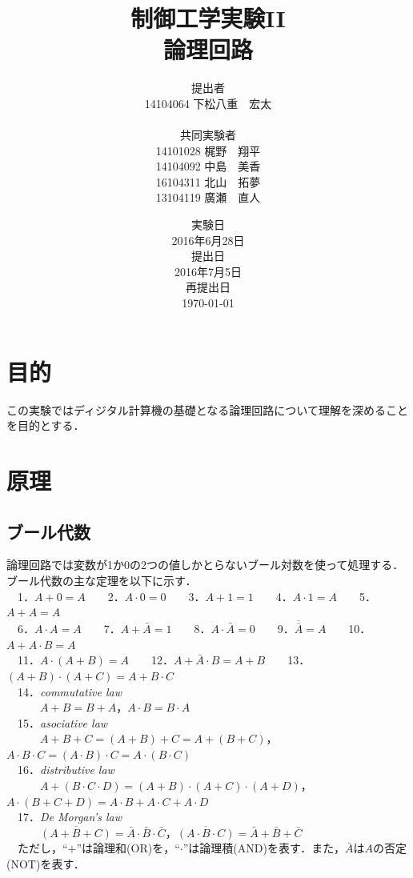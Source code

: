 \documentclass[11pt,a4paper]{jsarticle}
\begin{document}
\title{制御工学実験II \\ 論理回路}
\author{提出者 \\ 14104064 下松八重　宏太 \\ \\ 共同実験者 \\ 14101028 梶野　翔平 \\ 14104092 中島　美香 \\ 16104311 北山　拓夢 \\ 13104119 廣瀬　直人}
\date{実験日 \\ 2016年6月28日 \\ 提出日 \\ 2016年7月5日 \\ 再提出日 \\ \today}



\maketitle
\thispagestyle{empty}
\newpage


 \section{目的}
この実験ではディジタル計算機の基礎となる論理回路について理解を深めることを目的とする．
 \section{原理}
  \subsection{ブール代数}
  論理回路では変数が1か0の2つの値しかとらないブール対数を使って処理する．ブール代数の主な定理を以下に示す．\\
　1．$A+0 = A$\ \ \ \ 2．$A \cdot 0 = 0$\ \ \ \ 3．$A+1 = 1$\ \ \ \ 4．$A \cdot 1 = A$\ \ \ \ 5．$A+A = A$ \\
　6．$A \cdot A = A$\ \ \ \ 7．$A+ \bar A = 1$\ \ \ \ 8．$A \cdot \bar A = 0$\ \ \ \ 9．$\overline{\overline{A}} = A$\ \ \ \ 10．$A + A \cdot B = A$ \\
　11．$A \cdot (A + B) = A$\ \ \ \ 12．$A + \bar A \cdot B = A + B$\ \ \ \ 13．$(A+B)\cdot(A+C) = A+B\cdot C$\\
　14．{\it commutative law} \\
　　　$A+B = B+A$，$A\cdot B = B\cdot A$ \\
　15．{\it asociative law} \\
　　　$A+B+C = (A+B)+C = A+(B+C)$，$A\cdot B\cdot C = (A\cdot B)\cdot C = A\cdot (B\cdot C)$\\
　16．{\it distributive law} \\
　　　$A+(B \cdot C \cdot D) = (A+B)\cdot(A+C)\cdot(A+D)$，$A\cdot(B+C+D)=A\cdot B+A\cdot C+A\cdot D$\\
　17．{\it De Morgan's law} \\
　　　$\overline{(A+B+C)} = \bar{A} \cdot \bar{B} \cdot \bar{C}$，$\overline{(A \cdot B \cdot C)}= \bar A + \bar B + \bar C$ \\
　ただし，``$+$''は論理和(OR)を，``$\cdot$''は論理積(AND)を表す．また，$\bar A$は$A$の否定(NOT)を表す．
\end{document}
